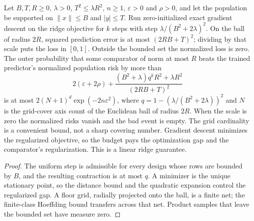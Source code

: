 \begin{lemma}\label{lem:trained_ridge}
\leanok
{}
Let $B,T,R\geq 0$, $\lambda>0$, $T^2\leq\lambda R^2$, $n\geq 1$, $\varepsilon>0$
and $\rho>0$, and let the population be supported on $\|x\|\leq B$ and
$|y|\leq T$. Run zero-initialized exact gradient descent on the ridge objective
for $k$ steps with step $\lambda/(B^2+2\lambda)^2$. On the ball of radius $2R$,
squared prediction error is at most $(2RB+T)^2$; dividing by that scale puts the
loss in $[0,1]$. Outside the bounded set the normalized loss is zero.
The outer probability that some comparator of norm at most $R$ beats the trained
predictor's normalized population risk by more than
\[
2(\varepsilon+2\rho)+\frac{(B^2+\lambda)q^k R^2+\lambda R^2}{(2RB+T)^2}
\]
is at most $2(N+1)^d\exp(-2n\varepsilon^2)$, where
$q=1-(\lambda/(B^2+2\lambda))^2$ and $N$ is the grid-cover axis count of the
Euclidean ball of radius $2R$. When the scale is zero the normalized risks
vanish and the bad event is empty. The grid cardinality is a convenient bound,
not a sharp covering number. Gradient descent minimizes the regularized
objective, so the budget pays the optimization gap and the comparator's
regularization. This is a linear ridge guarantee.
\end{lemma}
\begin{proof}
\leanok
The uniform step is admissible for every design whose rows are bounded by $B$,
and the resulting contraction is at most $q$. A minimizer is the unique
stationary point, so the distance bound and the quadratic expansion control the
regularized gap. A floor grid, radially projected onto the ball, is a finite
net; the finite-class Hoeffding bound transfers across that net. Product
samples that leave the bounded set have measure zero.
\end{proof}

